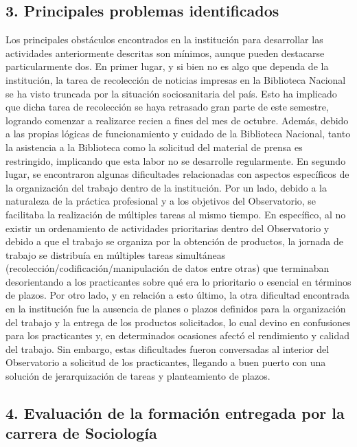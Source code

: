 \documentclass[
  12pt,
]{article}
\begin{document}
\hypertarget{principales-problemas-identificados}{%
\subsection{3. Principales problemas
identificados}\label{principales-problemas-identificados}}

\doublespacing

Los principales obstáculos encontrados en la institución para
desarrollar las actividades anteriormente descritas son mínimos, aunque
pueden destacarse particularmente dos. En primer lugar, y si bien no es
algo que dependa de la institución, la tarea de recolección de noticias
impresas en la Biblioteca Nacional se ha visto truncada por la situación
sociosanitaria del país. Esto ha implicado que dicha tarea de
recolección se haya retrasado gran parte de este semestre, logrando
comenzar a realizarce recien a fines del mes de octubre. Además, debido
a las propias lógicas de funcionamiento y cuidado de la Biblioteca
Nacional, tanto la asistencia a la Biblioteca como la solicitud del
material de prensa es restringido, implicando que esta labor no se
desarrolle regularmente. En segundo lugar, se encontraron algunas
dificultades relacionadas con aspectos específicos de la organización
del trabajo dentro de la institución. Por un lado, debido a la
naturaleza de la práctica profesional y a los objetivos del
Observatorio, se facilitaba la realización de múltiples tareas al mismo
tiempo. En específico, al no existir un ordenamiento de actividades
prioritarias dentro del Observatorio y debido a que el trabajo se
organiza por la obtención de productos, la jornada de trabajo se
distribuía en múltiples tareas simultáneas
(recolección/codificación/manipulación de datos entre otras) que
terminaban desorientando a los practicantes sobre qué era lo prioritario
o esencial en términos de plazos. Por otro lado, y en relación a esto
último, la otra dificultad encontrada en la institución fue la ausencia
de planes o plazos definidos para la organización del trabajo y la
entrega de los productos solicitados, lo cual devino en confusiones para
los practicantes y, en determinados ocasiones afectó el rendimiento y
calidad del trabajo. Sin embargo, estas dificultades fueron conversadas
al interior del Observatorio a solicitud de los practicantes, llegando a
buen puerto con una solución de jerarquización de tareas y planteamiento
de plazos.

\hypertarget{evaluaciuxf3n-de-la-formaciuxf3n-entregada-por-la-carrera-de-sociologuxeda}{%
\subsection{4. Evaluación de la formación entregada por la carrera de
Sociología}\label{evaluaciuxf3n-de-la-formaciuxf3n-entregada-por-la-carrera-de-sociologuxeda}}
\end{document}
